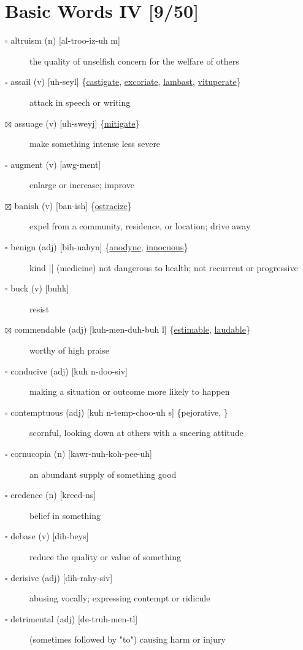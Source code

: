 \documentclass[11pt]{article}
\begin{document}
\section{Basic Words IV [9/50]}
\label{sec:org596928a}
\begin{description}
\item[{$\square$ altruism (n) [al-troo-iz-uh m] }] the quality of unselfish concern for the welfare of others
\item[{$\square$ \label{orgb5ea66c}assail (v) [uh-seyl] \{\hyperref[org41ed9c5]{castigate}, \hyperref[org58b0cbc]{excoriate}, \hyperref[orgcb82180]{lambast}, \hyperref[orgad849f5]{vituperate}\}}] attack in speech or writing
\item[{$\boxtimes$ \label{org70bdfd2}assuage (v) [uh-sweyj] \{\hyperref[org8400f8e]{mitigate}\}}] make something intense less severe
\item[{$\square$ augment (v) [awg-ment]}] enlarge or increase; improve
\item[{$\boxtimes$ \label{orgd3acd25}banish (v) [ban-ish] \{\hyperref[org7a04a9a]{ostracize}\}}] expel from a community, residence, or location; drive away
\item[{$\square$ \label{org0405622}benign (adj) [bih-nahyn] \{\hyperref[orgf23f0a8]{anodyne}, \hyperref[org773281e]{innocuous}\}}] kind || (medicine) not dangerous to health; not recurrent or progressive
\item[{$\square$ buck (v) [buhk]}] resist
\item[{$\boxtimes$ \label{org0a0f360} \label{orge207bcb}commendable (adj) [kuh-men-duh-buh l] \{\hyperref[org2d83783]{estimable}, \hyperref[org9063730]{laudable}\}}] worthy of high praise
\item[{$\square$ conducive (adj) [kuh n-doo-siv]}] making a situation or outcome more likely to happen
\item[{$\square$ contemptuous (adj) [kuh n-temp-choo-uh s] \{pejorative, \}}] scornful, looking down at others with a sneering attitude
\item[{$\square$ cornucopia (n) [kawr-nuh-koh-pee-uh]}] an abundant supply of something good
\item[{$\square$ credence (n) [kreed-ns]}] belief in something
\item[{$\square$ debase (v) [dih-beys]}] reduce the quality or value of something
\item[{$\square$ derisive (adj) [dih-rahy-siv]}] abusing vocally; expressing contempt or ridicule
\item[{$\square$ detrimental (adj) [de-truh-men-tl]}] (sometimes followed by "to") causing harm or injury

\end{description}
\end{document}
